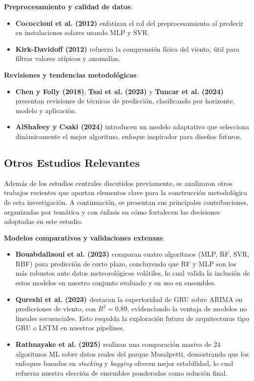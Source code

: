 \documentclass[conference]{IEEEtran}
\begin{document}
	\textbf{Preprocesamiento y calidad de datos}:
	\begin{itemize}[leftmargin=*,itemsep=1pt]
		\item \textbf{Cococcioni et al. (2012)} enfatizan el rol del preprocesamiento al predecir en instalaciones solares usando MLP y SVR.
		\item \textbf{Kirk-Davidoff (2012)} refuerza la comprensión física del viento, útil para filtrar valores atípicos y anomalías.
	\end{itemize}
	
	\textbf{Revisiones y tendencias metodológicas}:
	\begin{itemize}[leftmargin=*,itemsep=1pt]
		\item \textbf{Chen y Folly (2018)}, \textbf{Tsai et al. (2023)} y \textbf{Tuncar et al. (2024)} presentan revisiones de técnicas de predicción, clasificando por horizonte, modelo y aplicación.
		\item \textbf{AlShafeey y Csaki (2024)} introducen un modelo adaptativo que selecciona dinámicamente el mejor algoritmo, enfoque inspirador para diseños futuros.
	\end{itemize}
	
	\subsection{Otros Estudios Relevantes}
	
	Además de los estudios centrales discutidos previamente, se analizaron otros trabajos recientes que aportan elementos clave para la construcción metodológica de esta investigación. A continuación, se presentan sus principales contribuciones, organizadas por temática y con énfasis en cómo fortalecen las decisiones adoptadas en este estudio.
	
	\vspace{0.3cm}
	
	\textbf{Modelos comparativos y validaciones extensas}:
	\begin{itemize}[leftmargin=*,itemsep=1pt]
		\item \textbf{Bouabdallaoui et al. (2023) \cite{bouabdallaoui2023application}} comparan cuatro algoritmos (MLP, RF, SVR, RBF) para predicción de corto plazo, concluyendo que RF y MLP son los más robustos ante datos meteorológicos volátiles, lo cual valida la inclusión de estos modelos en nuestro conjunto evaluado y su uso en ensembles.
		\item \textbf{Qureshi et al. (2023) \cite{qureshi2023shortterm}} destacan la superioridad de GRU sobre ARIMA en predicciones de viento, con \(R^2 = 0.89\), evidenciando la ventaja de modelos no lineales secuenciales. Esto respalda la exploración futura de arquitecturas tipo GRU o LSTM en nuestros pipelines.
		\item \textbf{Rathnayake et al. (2025) \cite{rathnayake2025predicting}} realizan una comparación masiva de 24 algoritmos ML sobre datos reales del parque Musalpetti, demostrando que los enfoques basados en \textit{stacking} y \textit{bagging} ofrecen mejor estabilidad, lo cual refuerza nuestra elección de ensembles ponderados como solución final.
	\end{itemize}
	
\end{document}
